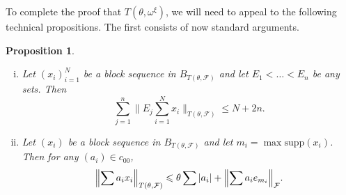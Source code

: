 \documentclass[12pt]{amsart}
\newtheorem{proposition}[theorem]{Proposition}
\theoremstyle{definition}
\newcommand{\fff}{\mathcal{F}}
\newcommand{\supp}{\mathrm{supp}}
\begin{document}
To complete the proof that $T(\theta, \omega^\xi)$, we will need to appeal to the following technical propositions.  The first consists of now standard arguments.    

\begin{proposition} \begin{enumerate}[(i)]\item Let $(x_i)_{i=1}^N$ be a block sequence in $B_{T(\theta, \fff)}$ and let $E_1<\ldots < E_n$ be any sets. Then $$\sum_{j=1}^n \bigl\|E_j\sum_{i=1}^N x_i\bigr\|_{T(\theta, \fff)} \leqslant N+2n.$$  \item Let $(x_i)$ be a block sequence in $B_{T(\theta, \fff)}$ and let $m_i=\max \supp(x_i)$.  Then for any $(a_i)\in c_{00}$, $$\Bigl\|\sum a_ix_i\Bigr\|_{T(\theta, \fff)} \leqslant \theta\sum |a_i| + \Bigl\|\sum a_i e_{m_i}\Bigr\|_\fff.$$  
\end{enumerate}


\label{technical 1}
\end{proposition}
\end{document}
